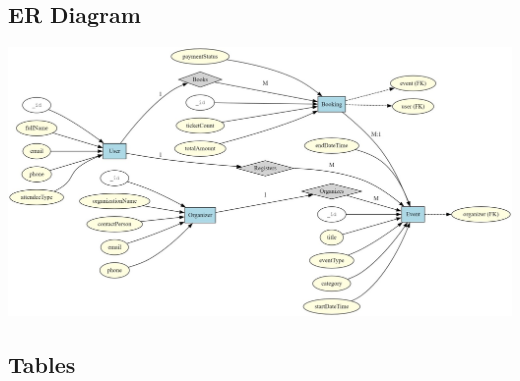 \documentclass[twoside,a4paper,openright]{report} %
\begin{document}
\subsection { ER Diagram}
\vspace{2.40cm}
\begin{flushleft}
	\begin{minipage}{\linewidth}
		\centering
		\includegraphics[width=\linewidth]{er.jpg}
	     	\label{fig:er-diagram}
	\end{minipage}
\end{flushleft}
\newpage
\subsection{Tables}
\end{document}
